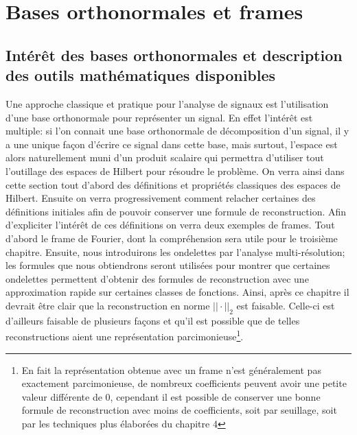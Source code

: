 \section{Bases orthonormales et frames}
\subsection{Intérêt des bases orthonormales et description des outils mathématiques disponibles}
Une approche classique et pratique pour l'analyse de signaux est l'utilisation d'une base orthonormale pour représenter un signal. 
En effet l'intérêt est multiple: si l'on connait une base orthonormale de décomposition d'un signal, il y a une unique façon d'écrire ce signal dans cette base, mais surtout, l'espace est alors naturellement muni d'un produit scalaire qui permettra d'utiliser tout l'outillage des espaces de Hilbert pour résoudre le problème.
\newline
On verra ainsi dans cette section tout d'abord des définitions et propriétés classiques des espaces de Hilbert. 
Ensuite on verra progressivement comment relacher certaines des définitions initiales afin de pouvoir conserver une formule de reconstruction.
Afin d'expliciter l'intérêt de ces définitions on verra deux exemples de frames.
Tout d'abord le frame de Fourier, dont la compréhension sera utile pour le troisième chapitre.
Ensuite, nous introduirons les ondelettes par l'analyse multi-résolution; les formules que nous obtiendrons seront utilisées pour montrer que certaines ondelettes permettent d'obtenir des formules de reconstruction avec une approximation rapide sur certaines classes de fonctions.
Ainsi, après ce chapitre il devrait être clair que la reconstruction en norme $||\cdot||_2$ est faisable.
Celle-ci est d'ailleurs faisable de plusieurs façons et qu'il est possible que de telles reconstructions aient une représentation parcimonieuse\footnote{En fait la représentation obtenue avec un frame n'est généralement pas exactement parcimonieuse, de nombreux coefficients peuvent avoir une petite valeur différente de 0, cependant il est possible de conserver une bonne formule de reconstruction avec moins de coefficients, soit par seuillage, soit par les techniques plus élaborées du chapitre 4}.
